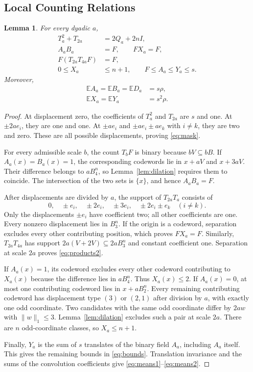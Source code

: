 \documentclass[12pt,letterpaper,onecolumn]{article}
\newtheorem{lemma}[theorem]{Lemma}
\theoremstyle{definition}
\newcommand{\E}{\mathbb{E}}
\newcommand{\norm}[1]{\lVert #1\rVert_1}
\begin{document}
\subsection{Local Counting Relations}
\begin{lemma}\label{lem:geometry}
For every dyadic $a$,
\begin{align}
 T_a^2+T_{2a}&=2Q_a+2nI,\label{eq:mask}\\
 A_aB_a&=F,\qquad FX_a=F,\label{eq:products1}\\
 F(T_{2a}T_{4a}F)&=F,\label{eq:products2}\\
 0\le X_a&\le n+1,\qquad F\le A_a\le Y_a\le s.\label{eq:bounds}
\end{align}
Moreover,
\begin{align}
 \E A_a=\E B_a=\E D_a&=s\rho,\label{eq:means1}\\
 \E X_a=\E Y_a&=s^2\rho.\label{eq:means2}
\end{align}
\end{lemma}
\begin{proof}
At displacement zero, the coefficients of $T_a^2$ and $T_{2a}$ are $s$ and one. At $\pm2ae_i$, they are one and one. At $\pm ae_i$ and $\pm ae_i\pm ae_k$ with $i\ne k$, they are two and zero. These are all possible displacements, proving \eqref{eq:mask}.

For every admissible scale $b$, the count $T_bF$ is binary because $bV\subseteq bB$. If $A_a(x)=B_a(x)=1$, the corresponding codewords lie in $x+aV$ and $x+3aV$. Their difference belongs to $aB_4^n$, so Lemma~\ref{lem:dilation} requires them to coincide. The intersection of the two sets is $\{x\}$, and hence $A_aB_a=F$.

After displacements are divided by $a$, the support of $T_{2a}T_a$ consists of
\begin{equation}\label{eq:x-support}
 0,\quad\pm e_i,\quad\pm2e_i,\quad\pm3e_i,
 \quad\pm2e_i\pm e_k\quad(i\ne k).
\end{equation}
Only the displacements $\pm e_i$ have coefficient two; all other coefficients are one. Every nonzero displacement lies in $B_3^n$. If the origin is a codeword, separation excludes every other contributing position, which proves $FX_a=F$. Similarly, $T_{2a}T_{4a}$ has support $2a(V+2V)\subseteq2aB_3^n$ and constant coefficient one. Separation at scale $2a$ proves \eqref{eq:products2}.

If $A_a(x)=1$, its codeword excludes every other codeword contributing to $X_a(x)$ because the difference lies in $aB_4^n$. Thus $X_a(x)\le2$. If $A_a(x)=0$, at most one contributing codeword lies in $x+aB_2^n$. Every remaining contributing codeword has displacement type $(3)$ or $(2,1)$ after division by $a$, with exactly one odd coordinate. Two candidates with the same odd coordinate differ by $2aw$ with $\norm{w}\le3$. Lemma~\ref{lem:dilation} excludes such a pair at scale $2a$. There are $n$ odd-coordinate classes, so $X_a\le n+1$.

Finally, $Y_a$ is the sum of $s$ translates of the binary field $A_a$, including $A_a$ itself. This gives the remaining bounds in \eqref{eq:bounds}. Translation invariance and the sums of the convolution coefficients give \eqref{eq:means1}--\eqref{eq:means2}.
\end{proof}
\end{document}

